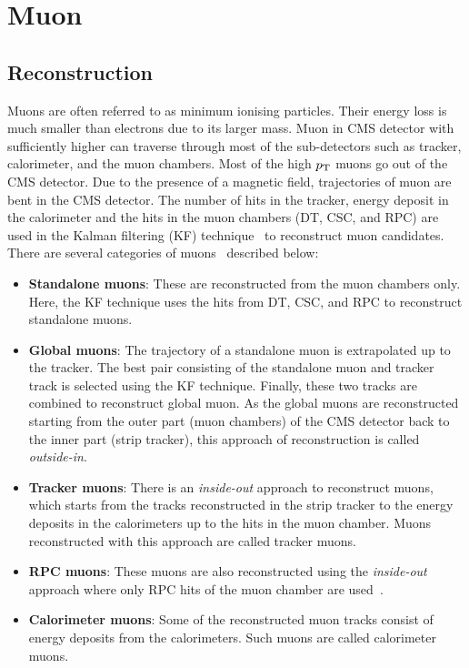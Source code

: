 \section{Muon}
\label{s:muReco}
\subsection{Reconstruction}
Muons are often referred to as minimum ionising particles. Their energy loss is much smaller than 
electrons due to its larger mass. Muon in CMS detector with sufficiently higher \pt can traverse 
through most of the sub-detectors such as tracker, calorimeter, and the muon chambers. Most of the 
high $p_{\mathrm{T}}$ muons go out of the CMS detector. Due to the presence of a magnetic field, trajectories 
of muon are bent in the CMS detector. The number of hits in the tracker, energy deposit in the 
calorimeter and the hits in the muon chambers (DT, CSC, and RPC) are used in the Kalman filtering (KF) 
technique~\cite{FRUHWIRTH1987444} to reconstruct muon candidates. There are several categories of 
muons~\cite{Chatrchyan:2012xi} described below:
\begin{itemize}[leftmargin=*]
   \item {\bf{ Standalone muons}}: These are reconstructed from the muon chambers only. Here, the
       KF technique uses the hits from DT, CSC, and RPC to reconstruct standalone muons.
   \item {\bf{ Global muons}}: The trajectory of a standalone muon is extrapolated up to the tracker. 
       The best pair consisting of the standalone muon and tracker track is selected using the
       KF technique. Finally, these two tracks are combined to reconstruct global muon.
       As the global muons are reconstructed starting from the outer part (muon chambers) of the CMS 
	detector back to the inner part (strip tracker), this approach of reconstruction is called 
       {\em outside-in}.
   \item {\bf{ Tracker muons}}: There is an {\em inside-out} approach to reconstruct muons, which 
       starts from the tracks reconstructed in the strip tracker to the energy deposits in the calorimeters
       up to the hits in the muon chamber. Muons reconstructed with this approach are called tracker muons.
   \item {\bf{ RPC muons}}: These muons are also reconstructed using the {\em inside-out} approach 
       where only RPC hits of the muon chamber are used~\cite{Goh:2014tra}. 
   \item {\bf{ Calorimeter muons}}: Some of the reconstructed muon tracks consist of energy deposits
       from the calorimeters. Such muons are called calorimeter muons.
\end{itemize}

